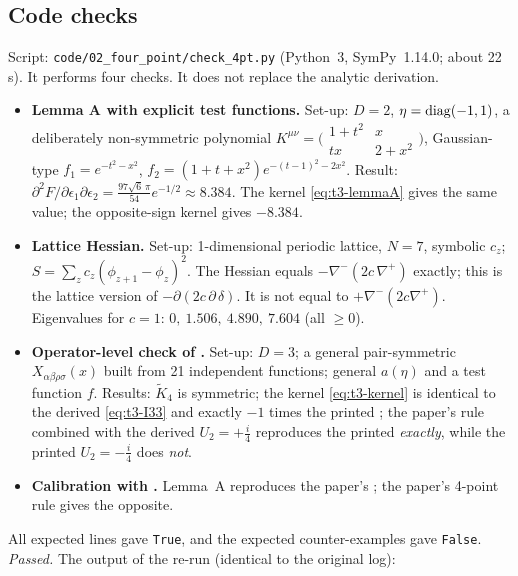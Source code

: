 \subsection{Code checks \texorpdfstring{\tC}{}}\label{sec:t3-code}
Script: \texttt{code/02\_four\_point/check\_4pt.py} (Python~3, SymPy~1.14.0; about
22\,s). It performs four checks. It does not replace the analytic derivation.
\begin{itemize}
\item[(a)] \textbf{Lemma A with explicit test functions.}
Set-up: \(D=2\), \(\eta={\rm diag}(-1,1)\), a deliberately non-symmetric polynomial
\(K^{\mu\nu}=\bigl(\begin{smallmatrix}1+t^2&x\\ tx&2+x^2\end{smallmatrix}\bigr)\), Gaussian-type
\(f_1=e^{-t^2-x^2}\), \(f_2=(1+t+x^2)e^{-(t-1)^2-2x^2}\).
Result: \(\partial^2F/\partial\epsilon_1\partial\epsilon_2=\tfrac{97\sqrt6\,\pi}{54}e^{-1/2}\approx8.384\).
The kernel \eqref{eq:t3-lemmaA} gives the same value; the opposite-sign kernel gives
\(-8.384\).
\item[(b)] \textbf{Lattice Hessian.}
Set-up: 1-dimensional periodic lattice, \(N=7\), symbolic \(c_z\);
\(S=\sum_zc_z(\phi_{z+1}-\phi_z)^2\).
The Hessian equals \(-\nabla^-(2c\,\nabla^+)\) exactly; this is the lattice version of
\(-\partial(2c\,\partial\,\delta)\). It is not equal to \(+\nabla^-(2c\nabla^+)\).
Eigenvalues for \(c=1\): \(0,\ 1.506,\ 4.890,\ 7.604\) (all \(\ge0\)).
\item[(c)] \textbf{Operator-level check of .}
Set-up: \(D=3\); a general pair-symmetric \(X_{\alpha\beta\rho\sigma}(x)\) built from 21
independent functions; general \(a(\eta)\) and a test function \(f\). Results:
\(\tilde K_4\) is symmetric; the kernel \eqref{eq:t3-kernel} is identical to the derived
\eqref{eq:t3-I33} and exactly \(-1\) times the printed ; the paper's rule
combined with the derived \(U_2=+\tfrac i4\) reproduces the printed 
\emph{exactly}, while the printed \(U_2=-\tfrac i4\) does \emph{not}.
\item[(d)] \textbf{Calibration with .} Lemma~A reproduces the paper's ;
the paper's 4-point rule gives the opposite.
\end{itemize}
All expected lines gave \texttt{True}, and the expected counter-examples gave
\texttt{False}. \emph{Passed.} The output of the re-run (identical to the original log):
\begingroup\scriptsize
